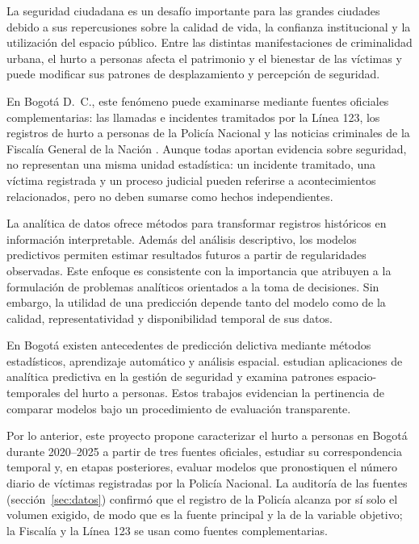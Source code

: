 \documentclass[12pt,letterpaper]{article}
\begin{document}
La seguridad ciudadana es un desafío importante para las grandes ciudades debido a sus repercusiones sobre la calidad de vida, la confianza institucional y la utilización del espacio público. Entre las distintas manifestaciones de criminalidad urbana, el hurto a personas afecta el patrimonio y el bienestar de las víctimas y puede modificar sus patrones de desplazamiento y percepción de seguridad.

En Bogotá D.~C., este fenómeno puede examinarse mediante fuentes oficiales complementarias: las llamadas e incidentes tramitados por la Línea 123, los registros de hurto a personas de la Policía Nacional y las noticias criminales de la Fiscalía General de la Nación \citep{linea123,policia,fiscalia}. Aunque todas aportan evidencia sobre seguridad, no representan una misma unidad estadística: un incidente tramitado, una víctima registrada y un proceso judicial pueden referirse a acontecimientos relacionados, pero no deben sumarse como hechos independientes.

La analítica de datos ofrece métodos para transformar registros históricos en información interpretable. Además del análisis descriptivo, los modelos predictivos permiten estimar resultados futuros a partir de regularidades observadas. Este enfoque es consistente con la importancia que \citet{provost2013} atribuyen a la formulación de problemas analíticos orientados a la toma de decisiones. Sin embargo, la utilidad de una predicción depende tanto del modelo como de la calidad, representatividad y disponibilidad temporal de sus datos.

En Bogotá existen antecedentes de predicción delictiva mediante métodos estadísticos, aprendizaje automático y análisis espacial. \citet{riascos2020} estudian aplicaciones de analítica predictiva en la gestión de seguridad y \citet{martinez2025} examina patrones espacio-temporales del hurto a personas. Estos trabajos evidencian la pertinencia de comparar modelos bajo un procedimiento de evaluación transparente.

Por lo anterior, este proyecto propone caracterizar el hurto a personas en Bogotá durante 2020--2025 a partir de tres fuentes oficiales, estudiar su correspondencia temporal y, en etapas posteriores, evaluar modelos que pronostiquen el número diario de víctimas registradas por la Policía Nacional. La auditoría de las fuentes (sección~\ref{sec:datos}) confirmó que el registro de la Policía alcanza por sí solo el volumen exigido, de modo que es la fuente principal y la de la variable objetivo; la Fiscalía y la Línea 123 se usan como fuentes complementarias.
\end{document}
